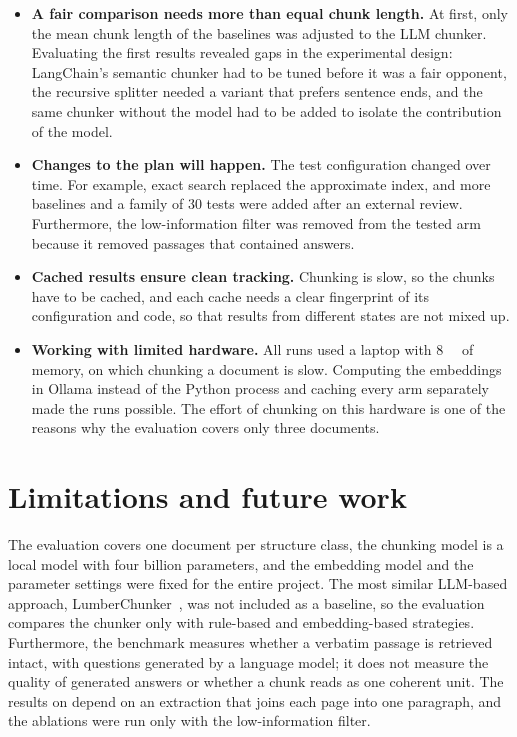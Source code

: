 \begin{itemize}
    \item \textbf{A fair comparison needs more than equal chunk length.} At first, only the
    mean chunk length of the baselines was adjusted to the LLM chunker. Evaluating the first
    results revealed gaps in the experimental design: LangChain's semantic chunker had to
    be tuned before it was a fair opponent, the recursive splitter needed a variant that
    prefers sentence ends, and the same chunker without the model had to be added to
    isolate the contribution of the model.

    \item \textbf{Changes to the plan will happen.} The test configuration changed over
    time. For example, exact search replaced the approximate index, and more baselines and
    a family of 30 tests were added after an external review. Furthermore, the
    low-information filter was removed from the tested arm because it removed passages that
    contained answers.

    \item \textbf{Cached results ensure clean tracking.} Chunking is slow, so the
    chunks have to be cached, and each cache needs a clear fingerprint of its configuration
    and code, so that results from different states are not mixed up.

    \item \textbf{Working with limited hardware.} All runs used a laptop with
    \SI{8}{\giga\byte} of memory, on which chunking a document is slow.
    Computing the embeddings in Ollama instead of the Python process and caching every arm
    separately made the runs possible. The effort of chunking on this hardware is one of
    the reasons why the evaluation covers only three documents.
\end{itemize}

\section{Limitations and future work}
\label{sec:future}

The evaluation covers one document per structure class, the chunking model is a local
model with four billion parameters, and the embedding model and the parameter settings
were fixed for the entire project. The most similar LLM-based approach,
LumberChunker~\cite{duarte2024lumberchunker}, was not included as a baseline, so the
evaluation compares the chunker only with rule-based and embedding-based strategies.
Furthermore, the benchmark measures whether a verbatim
passage is retrieved intact, with questions generated by a language model; it does not
measure the quality of generated answers or whether a chunk reads as one coherent unit.
The results on  depend on an extraction that joins each page into one
paragraph, and the ablations were run only with the low-information filter.

